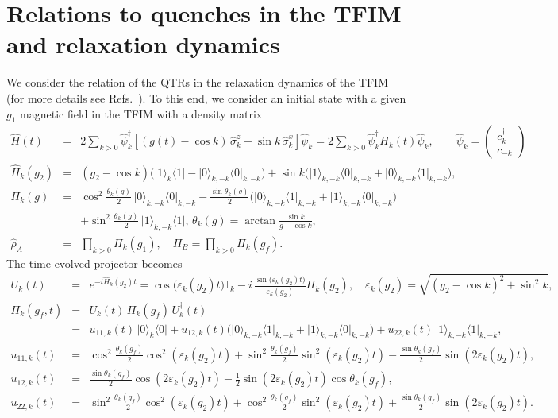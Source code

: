 \documentclass[prl,aps,amssymb,twocolumn,superscriptaddress, notitlepage, longbibliography]{revtex4-2}
\begin{document}
\section{Relations to quenches in the TFIM and relaxation dynamics}
We consider the relation of the QTRs in the relaxation dynamics of the TFIM (for more details see Refs.~\cite{Calabrese_PRL2011,Calabrese_2012Review,Calabrese_2012_Review2}). To this end, we consider an initial state with a given $g_1$ magnetic field in the TFIM with a density matrix
\begin{eqnarray}
\hat{H}(t) &=& 2 \sum_{k>0} \hat{\psi}_k^\dagger \left[ (g(t)-\cos k)\, \hat\sigma^z_k + \sin k \, \hat\sigma^x_k \right] \hat{\psi}_k
= 2 \sum_{k>0} \hat{\psi}_k^\dagger H_k(t) \hat{\psi}_k,
\qquad
\hat\psi_k = \begin{pmatrix} c^\dagger_k \\ c_{-k} \end{pmatrix}\\
\hat H_k(g_2) &=&(g_2 - \cos k) \Big( \lvert 1 \rangle_k \langle 1 \rvert - \lvert 0 \rangle_{k,-k} \langle 0 \rvert_{k,-k} \Big)
+ \sin k \Big( \lvert 1 \rangle_{k,-k} \langle 0 \rvert_{k,-k} + \lvert 0 \rangle_{k,-k} \langle 1 \rvert_{k,-k} \Big),\\
    \Pi_k(g) &=& \cos^2\frac{\theta_k(g)}{2} \, \lvert 0\rangle_{k,-k} \langle 0 \rvert_{k,-k}
- \frac{\sin \theta_k(g)}{2} \big( \lvert 0\rangle_{k,-k} \langle 1 \rvert_{k,-k} + \lvert 1\rangle_{k,-k} \langle 0 \rvert_{k,-k} \big)
\\
&&+ \sin^2\frac{\theta_k(g)}{2} \, \lvert 1\rangle_{k,-k} \langle 1 \rvert,\,
\theta_k(g) = \arctan \frac{\sin k}{g - \cos k},\nonumber\\
    \hat\rho_A &=& \prod_{k>0}\Pi_k(g_1),\quad\Pi_B = \prod_{k>0} \Pi_k(g_f).
\end{eqnarray}
The time-evolved projector becomes
\begin{eqnarray}
    U_k(t)&=&e^{-i \hat{H}_k(g_2) t}=\cos\big(\varepsilon_k(g_2) t\big) \, \mathbb{I}_k
- i \, \frac{\sin\big(\varepsilon_k(g_2) t\big)}{\varepsilon_k(g_2)}
H_k(g_2),\quad\varepsilon_k(g_2) = \sqrt{(g_2 - \cos k)^2 + \sin^2 k},\\
    \Pi_k(g_f,t) &=& U_k(t) \, \Pi_k(g_f) \, U_k^\dagger(t) \\
&=& u_{11,k}(t) \, \lvert 0\rangle_k \langle 0 \rvert
+ u_{12,k}(t) \big( \lvert 0\rangle_{k,-k} \langle 1 \rvert_{k,-k} + \lvert 1\rangle_{k,-k} \langle 0 \rvert_{k,-k} \big)
+ u_{22,k}(t) \, \lvert 1\rangle_{k,-k} \langle 1 \rvert_{k,-k},\nonumber\\
u_{11,k}(t) &=& \cos^2\frac{\theta_k(g_f)}{2} \cos^2(\varepsilon_k(g_2) t) + \sin^2\frac{\theta_k(g_f)}{2} \sin^2(\varepsilon_k(g_2) t)  - \frac{\sin\theta_k(g_f)}{2} \sin(2 \varepsilon_k(g_2) t),\\
u_{12,k}(t) &=& \frac{\sin\theta_k(g_f)}{2} \cos(2 \varepsilon_k(g_2) t) - \frac{1}{2} \sin(2 \varepsilon_k(g_2) t) \cos\theta_k(g_f),\\
u_{22,k}(t) &=& \sin^2\frac{\theta_k(g_f)}{2} \cos^2(\varepsilon_k(g_2) t) + \cos^2\frac{\theta_k(g_f)}{2} \sin^2(\varepsilon_k(g_2) t)  + \frac{\sin\theta_k(g_f)}{2} \sin(2 \varepsilon_k(g_2) t).
\end{eqnarray}
\end{document}
